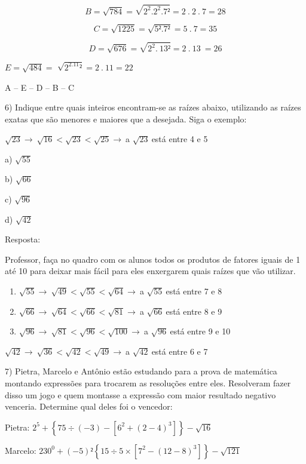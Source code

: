 \[B = \sqrt{784} = \sqrt{2^{2}.2^{2}.7²} = 2\ .\ 2\ .\ 7 = 28\]

\[C = \sqrt{1225} = \sqrt{5².7²} = 5\ .\ 7 = 35\]

\[D = \sqrt{676} = \sqrt{2^{2}.\ 13²} = 2\ .\ 13\  = 26\]

\(E = \sqrt{484} =\) \(\sqrt{2^2.11²} = 2\ .\ 11 = 22\)

A -- E -- D -- B -- C

6) Indique entre quais inteiros encontram-se as raízes abaixo,
utilizando as raízes exatas que são menores e maiores que a desejada.
Siga o exemplo:

\(\sqrt{23} \rightarrow \ \sqrt{16} < \sqrt{23} < \sqrt{25} \rightarrow \ \)a
\(\sqrt{23}\ \)está entre 4 e 5

a) \(\sqrt{55}\)

b) \(\sqrt{66}\)

c) \(\sqrt{96}\)

d) \(\sqrt{42}\)

Resposta:

Professor, faça no quadro com os alunos todos os produtos de fatores
iguais de 1 até 10 para deixar mais fácil para eles enxergarem quais
raízes que vão utilizar.

\begin{enumerate}
\def\labelenumi{\alph{enumi})}
\item
  \(\sqrt{55} \rightarrow \ \sqrt{49} < \sqrt{55} < \sqrt{64} \rightarrow \ \)a
  \(\sqrt{55}\ \)está entre 7 e 8
\item
  \(\sqrt{66} \rightarrow \ \sqrt{64} < \sqrt{66} < \sqrt{81} \rightarrow \ \)a
  \(\sqrt{66}\ \)está entre 8 e 9
\item
  \(\sqrt{96} \rightarrow \ \sqrt{81} < \sqrt{96} < \sqrt{100} \rightarrow \ \)a
  \(\sqrt{96}\ \)está entre 9 e 10
\end{enumerate}

\(\sqrt{42} \rightarrow \ \sqrt{36} < \sqrt{42} < \sqrt{49} \rightarrow \ \)a
\(\sqrt{42}\ \)está entre 6 e 7

7) Pietra, Marcelo e Antônio estão estudando para a prova de matemática
montando expressões para trocarem as resoluções entre eles. Resolveram
fazer disso um jogo e quem montasse a expressão com maior resultado
negativo venceria. Determine qual deles foi o vencedor:

Pietra:
\(2^{5} + \left\{ 75 \div \left( - 3 \right) - \left\lbrack 6^{2} + \left( 2 - 4 \right)^{3} \right\rbrack \right\} - \sqrt{16}\)

Marcelo:
\(230^{0} + ( - 5)²\left\{ 15 \div 5 \times \left\lbrack 7^{2} - \left( 12 - 8 \right)^{3} \right\rbrack \right\} - \sqrt{121}\)

